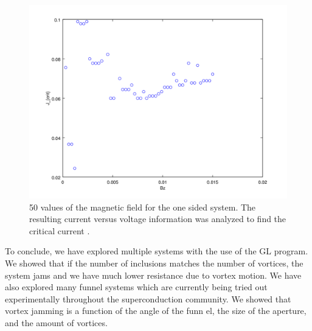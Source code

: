 \begin{figure}[htbp]
\begin{center}
\includegraphics[scale=.50]{oneSideBz.png}
\caption{ 50 values of the magnetic field for the one sided system. The resulting current versus voltage information was analyzed to find the critical current .  }
\label{oneBz}
\end{center}
\end{figure}

To conclude, we have explored multiple systems with the use of the GL program. We showed that if the number of inclusions matches the number of vortices, the system jams and we have much lower resistance due to vortex motion. We have also explored many funnel systems which are currently being tried out experimentally throughout the superconduction community. We showed that vortex jamming is a function of the angle of the funn
el, the size of the aperture, and the amount of vortices.

 
